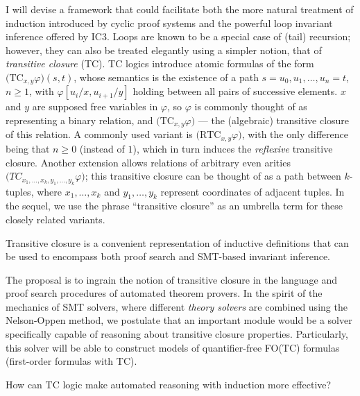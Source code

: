 I will devise a framework that could facilitate both the more natural treatment of induction introduced by cyclic proof systems and the powerful loop invariant inference offered by IC3.
Loops are known to be a special case of (tail) recursion; however, they can also be treated elegantly using a simpler notion, that of \emph{transitive closure} (TC).
TC logics introduce atomic formulas of the form $\big(\mathrm{TC}_{x,y}\varphi\big)(s,t)$,
whose semantics is the existence of a path $s=u_0,u_1,\ldots,u_n=t$, $n\geq 1$, with $\varphi[u_i/x,u_{i+1}/y]$
holding between all pairs of successive elements.
$x$ and $y$ are supposed free variables in $\varphi$, so $\varphi$ is commonly thought of as representing a binary relation, and $\big(\mathrm{TC}_{x,y}\varphi\big)$ --- the (algebraic) transitive closure of this relation.
A commonly used variant is $\big(\mathrm{RTC}_{x,y}\varphi\big)$, with the only difference being that $n\geq 0$ (instead of $1$),
which in turn induces the \emph{reflexive} transitive closure.
Another extension allows relations of arbitrary even arities
$\big(TC_{x_1,\ldots,x_k,y_1,\ldots,y_k}\varphi\big)$;
this transitive closure can be thought of as a path between $k$-tuples, where $x_1,\ldots,x_k$ and $y_1,\ldots,y_k$ represent coordinates of adjacent tuples.
In the sequel, we use the phrase ``transitive closure'' as an umbrella term for these closely related variants.

\begin{proposal}Transitive closure is a convenient representation of inductive definitions that can be used to encompass both proof search and SMT-based invariant inference.
\end{proposal}


The proposal is to ingrain the notion of transitive closure in the language and proof search procedures of automated theorem provers.
In the spirit of the mechanics of SMT solvers, where different \emph{theory solvers} are combined using the Nelson-Oppen method,
we postulate that an important module would be a solver specifically capable of reasoning
about transitive closure properties.
Particularly, this solver will be able to construct models of quantifier-free
FO(TC) formulas (first-order formulas with TC).

\begin{researchquestion}How can TC logic make automated reasoning with induction more effective?
\end{researchquestion}

